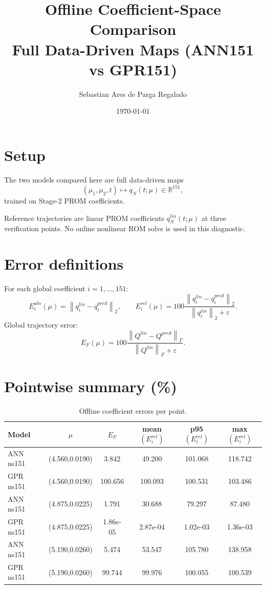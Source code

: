 \documentclass[11pt]{article}
\title{Offline Coefficient-Space Comparison\\Full Data-Driven Maps (ANN151 vs GPR151)}
\author{Sebastian Ares de Parga Regalado}
\date{\today}
\begin{document}
\maketitle

\section*{Setup}
The two models compared here are full data-driven maps
\[
(\mu_1,\mu_2,t)\mapsto q_N(t;\mu)\in\mathbb{R}^{151},
\]
trained on Stage-2 PROM coefficients.

Reference trajectories are linear PROM coefficients $q_N^{lin}(t;\mu)$ at three verification points.
No online nonlinear ROM solve is used in this diagnostic.

\section*{Error definitions}
For each global coefficient $i=1,\dots,151$:
\[
E_i^{abs}(\mu)=\left\|q_i^{lin}-q_i^{pred}\right\|_2,\qquad
E_i^{rel}(\mu)=100\frac{\left\|q_i^{lin}-q_i^{pred}\right\|_2}{\left\|q_i^{lin}\right\|_2+\varepsilon}.
\]
Global trajectory error:
\[
E_F(\mu)=100\frac{\left\|Q^{lin}-Q^{pred}\right\|_F}{\left\|Q^{lin}\right\|_F+\varepsilon}.
\]

\section*{Pointwise summary (\%)}
\begin{table}[H]
\centering
\caption{Offline coefficient errors per point.}
\begin{tabular}{lccccc}
\toprule
Model & $\mu$ & $E_F$ & mean$(E_i^{rel})$ & p95$(E_i^{rel})$ & max$(E_i^{rel})$ \\
\midrule
ANN ns151 & (4.560,0.0190) & 3.842 & 49.200 & 101.068 & 118.742 \\
GPR ns151 & (4.560,0.0190) & 100.656 & 100.093 & 100.531 & 103.486 \\
\hline
ANN ns151 & (4.875,0.0225) & 1.791 & 30.688 & 79.297 & 87.480 \\
GPR ns151 & (4.875,0.0225) & 1.86e-05 & 2.87e-04 & 1.02e-03 & 1.36e-03 \\
\hline
ANN ns151 & (5.190,0.0260) & 5.474 & 53.547 & 105.780 & 138.958 \\
GPR ns151 & (5.190,0.0260) & 99.744 & 99.976 & 100.055 & 100.539 \\
\hline
\bottomrule
\end{tabular}
\end{table}
\end{document}
